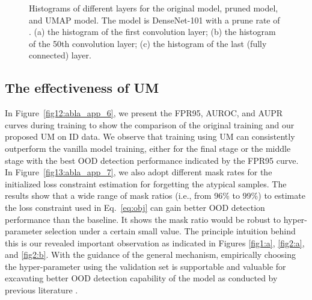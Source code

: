 \documentclass{article}
\theoremstyle{plain}
\theoremstyle{definition}
\theoremstyle{remark}
\begin{document}
\begin{figure}[h!]
    \begin{center}
    \end{center}
    \caption{Histograms of different layers for the original model, pruned model, and UMAP model. The model is DenseNet-101 with a prune rate of . (a) the histogram of the first convolution layer; (b) the histogram of the 50th convolution layer; (c) the histogram of the last (fully connected) layer.}
    \label{fig14:abla_app_8}
\end{figure}

\subsection{The effectiveness of UM}
\label{app:eff_um}

In Figure~\ref{fig12:abla_app_6}, we present the FPR95, AUROC, and AUPR curves during training to show the comparison of the original training and our proposed UM on ID data. We observe that training using UM can consistently outperform the vanilla model training, either for the final stage or the middle stage with the best OOD detection performance indicated by the FPR95 curve. In Figure~\ref{fig13:abla_app_7}, we also adopt different mask rates for the initialized loss constraint estimation for forgetting the atypical samples. The results show that a wide range of mask ratios (i.e., from 96\% to 99\%) to estimate the loss constraint used in Eq.~\eqref{eq:obj} can gain better OOD detection performance than the baseline. It shows the mask ratio would be robust to hyper-parameter selection under a certain small value. The principle intuition behind this is our revealed important observation as indicated in Figures \ref{fig1:a}, \ref{fig2:a}, and \ref{fig2:b}. With the guidance of the general mechanism, empirically choosing the hyper-parameter using the validation set is supportable and valuable for excavating better OOD detection capability of the model as conducted by previous literature \citep{hendrycks2018deep,liu2020energy,sun2021react}.
\end{document}

